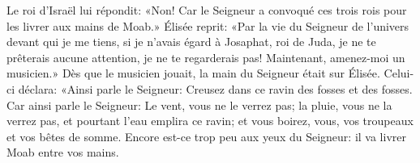 Le roi d’Israël lui répondit:
	«Non! Car le Seigneur a convoqué ces trois rois pour les livrer aux mains de Moab.»
Élisée reprit: «Par la vie du Seigneur de l’univers devant qui je me tiens,
	si je n’avais égard à Josaphat, roi de Juda,
	je ne te prêterais aucune attention, je ne te regarderais pas!
Maintenant, amenez-moi un musicien.»
Dès que le musicien jouait, la main du Seigneur était sur Élisée.
Celui-ci déclara:
	«Ainsi parle le Seigneur: Creusez dans ce ravin des fosses et des fosses.
Car ainsi parle le Seigneur:
	Le vent, vous ne le verrez pas; la pluie, vous ne la verrez pas,
	et pourtant l’eau emplira ce ravin; et vous boirez,
	vous, vos troupeaux et vos bêtes de somme.
Encore est-ce trop peu aux yeux du Seigneur:
	il va livrer Moab entre vos mains.
